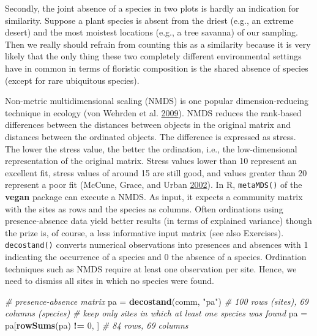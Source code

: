 \documentclass[]{krantz}
\newenvironment{Shaded}{\begin{snugshade}}{\end{snugshade}}
\newcommand{\CommentTok}[1]{\textcolor[rgb]{0.37,0.37,0.37}{\textit{#1}}}
\newcommand{\DecValTok}[1]{\textcolor[rgb]{0.06,0.06,0.06}{#1}}
\newcommand{\KeywordTok}[1]{\textcolor[rgb]{0.27,0.27,0.27}{\textbf{#1}}}
\newcommand{\NormalTok}[1]{#1}
\newcommand{\OperatorTok}[1]{\textcolor[rgb]{0.43,0.43,0.43}{\textbf{#1}}}
\newcommand{\StringTok}[1]{\textcolor[rgb]{0.5,0.5,0.5}{#1}}
\begin{document}
Secondly, the joint absence of a species in two plots is hardly an indication for similarity.
Suppose a plant species is absent from the driest (e.g., an extreme desert) and the most moistest locations (e.g., a tree savanna) of our sampling.
Then we really should refrain from counting this as a similarity because it is very likely that the only thing these two completely different environmental settings have in common in terms of floristic composition is the shared absence of species (except for rare ubiquitous species).

Non-metric multidimensional scaling (NMDS) is one popular dimension-reducing technique in ecology (von Wehrden et al. \protect\hyperlink{ref-vonwehrden_pluralism_2009}{2009}).
NMDS reduces the rank-based differences between the distances between objects in the original matrix and distances between the ordinated objects.
The difference is expressed as stress.
The lower the stress value, the better the ordination, i.e., the low-dimensional representation of the original matrix.
Stress values lower than 10 represent an excellent fit, stress values of around 15 are still good, and values greater than 20 represent a poor fit (McCune, Grace, and Urban \protect\hyperlink{ref-mccune_analysis_2002}{2002}).
In R, \texttt{metaMDS()} of the \textbf{vegan} package can execute a NMDS.
As input, it expects a community matrix with the sites as rows and the species as columns.
Often ordinations using presence-absence data yield better results (in terms of explained variance) though the prize is, of course, a less informative input matrix (see also Exercises).
\texttt{decostand()} converts numerical observations into presences and absences with 1 indicating the occurrence of a species and 0 the absence of a species.
Ordination techniques such as NMDS require at least one observation per site.
Hence, we need to dismiss all sites in which no species were found.

\begin{Shaded}
\begin{Highlighting}[]
\CommentTok{# presence-absence matrix}
\NormalTok{pa =}\StringTok{ }\KeywordTok{decostand}\NormalTok{(comm, }\StringTok{"pa"}\NormalTok{)  }\CommentTok{# 100 rows (sites), 69 columns (species)}
\CommentTok{# keep only sites in which at least one species was found}
\NormalTok{pa =}\StringTok{ }\NormalTok{pa[}\KeywordTok{rowSums}\NormalTok{(pa) }\OperatorTok{!=}\StringTok{ }\DecValTok{0}\NormalTok{, ]  }\CommentTok{# 84 rows, 69 columns}
\end{Highlighting}
\end{Shaded}
\end{document}
